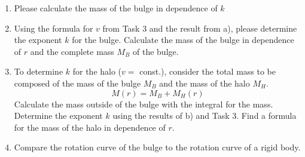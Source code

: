 \documentclass[a4paper,12pt]{article}
\begin{document}
\begin{enumerate}
	\begin{enumerate}
	\item Please calculate the mass of the bulge in dependence of $k$
	\item Using the formula for $v$ from Task 3 and the result from a), please determine the exponent $k$ for the bulge. Calculate the mass of the bulge in dependence of $r$ and the complete mass $M_B$ of the bulge.
	\item To determine $k$ for the halo ($v=$ const.), consider the total mass to be composed of the mass of the bulge $M_B$ and the mass of the halo $M_H$.
	\begin{equation*}
		M(r) = M_B +M_H(r)
	\end{equation*}
	Calculate the mass outside of the bulge with the integral for the mass. Determine the exponent $k$ using the results of b) and Task 3. Find a formula for the mass of the halo in dependence of $r$.
	\item Compare the rotation curve of the bulge to the rotation curve of a rigid body.
	\end{enumerate}
\end{enumerate}
\end{document}
